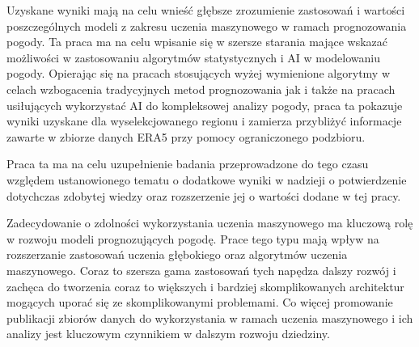 Uzyskane wyniki mają na celu wnieść głębsze zrozumienie zastosowań i wartości 
poszczególnych modeli z zakresu uczenia maszynowego w ramach prognozowania pogody.
Ta praca ma na celu wpisanie się w szersze starania mające wskazać możliwości
w zastosowaniu algorytmów statystycznych i AI w modelowaniu pogody. Opierając
się na pracach stosujących wyżej wymienione algorytmy w celach wzbogacenia
tradycyjnych metod prognozowania jak i także na pracach usiłujących wykorzystać AI
do kompleksowej analizy pogody, praca ta pokazuje wyniki uzyskane dla wyselekcjowanego
regionu i zamierza przybliżyć informacje zawarte w zbiorze danych ERA5 przy pomocy
ograniczonego podzbioru.

Praca ta ma na celu uzupełnienie badania przeprowadzone do tego czasu względem 
ustanowionego tematu o dodatkowe wyniki w nadzieji o potwierdzenie dotychczas 
zdobytej wiedzy oraz rozszerzenie jej o wartości dodane w tej pracy.

Zadecydowanie o zdolności wykorzystania uczenia maszynowego ma kluczową rolę w 
rozwoju modeli prognozujących pogodę. Prace tego typu mają wpływ na rozszerzanie
zastosowań uczenia głębokiego oraz algorytmów uczenia maszynowego. Coraz to szersza
gama zastosowań tych napędza dalszy rozwój i zachęca do tworzenia coraz to większych
i bardziej skomplikowanych architektur mogących uporać się ze skomplikowanymi problemami.
Co więcej promowanie publikacji zbiorów danych do wykorzystania w ramach uczenia
maszynowego i ich analizy jest kluczowym czynnikiem w dalszym rozwoju dziedziny.